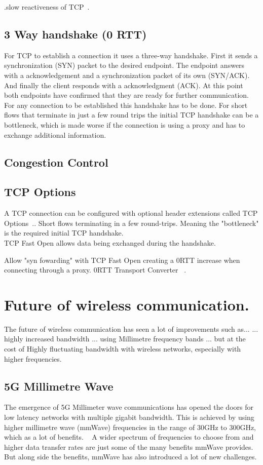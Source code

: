 \documentclass[a4paper,english, 11pt]{report}
\begin{document}
.slow reactiveness of TCP~\cite{tcp_mmwave_proxy}.

\subsection{3 Way handshake (0 RTT)}
For TCP to establish a connection it uses a three-way handshake. First it sends a synchronization (SYN) packet to the desired endpoint. The endpoint answers with a acknowledgement and a synchronization packet of its own (SYN/ACK). And finally the client responds with a acknowledgment (ACK). At this point both endpoints have confirmed that they are ready for further communication. For any connection to be established this handshake has to be done. For short flows that terminate in just a few round trips the initial TCP handshake can be a bottleneck, which is made worse if the connection is using a proxy and has to exchange additional information. 

\subsection{Congestion Control}

\subsection{TCP Options}
A TCP connection can be configured with optional header extensions called TCP Options~\cite{tcp_options}.. 
Short flows terminating in a few round-trips. Meaning the "bottleneck" is the required initial TCP handshake.\\
TCP Fast Open allows data being exchanged during the handshake. 

Allow "syn fowarding" with TCP Fast Open creating a 0RTT increase when connecting through a proxy.
0RTT Transport Converter ~\cite{rfc8803}.


\section{Future of wireless communication.}
The future of wireless communication has seen a lot of improvements such as...
... highly increased bandwidth ... using Millimetre frequency bands ... but at the cost of Highly fluctuating bandwidth with wireless networks, especially with higher frequencies.\\ 

\subsection{5G Millimetre Wave}
The emergence of 5G Millimeter wave communications has opened the doors for low latency networks with multiple gigabit bandwidth. This is achieved by using higher millimetre wave (mmWave) frequencies in the range of 30GHz to 300GHz, which as a lot of benefits. ~\cite{Agrawal_Sharma_2016} A wider spectrum of frequencies to choose from and higher data transfer rates are just some of the many benefits mmWave provides. But along side the benefits, mmWave has also introduced a lot of new challenges.\\
\end{document}
